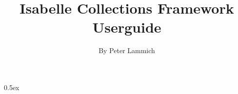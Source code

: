 \documentclass[11pt,a4paper]{article}
\begin{document}
\title{Isabelle Collections Framework Userguide}
\author{By Peter Lammich}
\maketitle

\clearpage

\tableofcontents

\clearpage

\parindent 0pt\parskip 0.5ex

\renewcommand{\isamarkupheader}[1]{}
\renewcommand{\isamarkupsubsection}[1]{\section{#1}}
\renewcommand{\isamarkupsubsubsection}[1]{\subsection{#1}}





\end{document}
